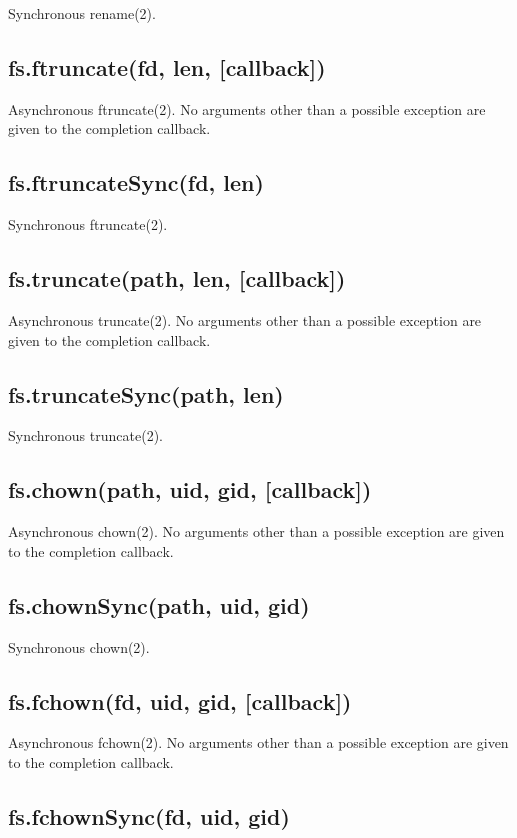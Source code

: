 Synchronous rename(2).

\subsection{fs.ftruncate(fd, len, {[}callback{]})}

Asynchronous ftruncate(2). No arguments other than a possible exception
are given to the completion callback.

\subsection{fs.ftruncateSync(fd, len)}

Synchronous ftruncate(2).

\subsection{fs.truncate(path, len, {[}callback{]})}

Asynchronous truncate(2). No arguments other than a possible exception
are given to the completion callback.

\subsection{fs.truncateSync(path, len)}

Synchronous truncate(2).

\subsection{fs.chown(path, uid, gid, {[}callback{]})}

Asynchronous chown(2). No arguments other than a possible exception are
given to the completion callback.

\subsection{fs.chownSync(path, uid, gid)}

Synchronous chown(2).

\subsection{fs.fchown(fd, uid, gid, {[}callback{]})}

Asynchronous fchown(2). No arguments other than a possible exception are
given to the completion callback.

\subsection{fs.fchownSync(fd, uid, gid)}

